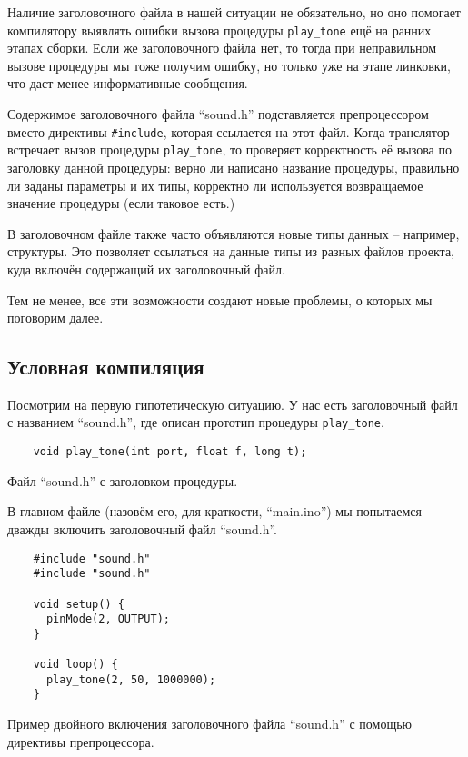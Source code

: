\documentclass[../sparc.tex]{subfiles}
\begin{document}
Наличие заголовочного файла в нашей ситуации не обязательно, но оно помогает
компилятору выявлять ошибки вызова процедуры \texttt{play_tone} ещё на
ранних этапах сборки.  Если же заголовочного файла нет, то тогда при
неправильном вызове процедуры мы тоже получим ошибку, но только уже на этапе
линковки, что даст менее информативные сообщения.

Содержимое заголовочного файла ``sound.h'' подставляется препроцессором вместо
директивы \texttt{#include}, которая ссылается на этот файл.  Когда
транслятор встречает вызов процедуры \texttt{play_tone}, то проверяет
корректность её вызова по заголовку данной процедуры: верно ли написано название
процедуры, правильно ли заданы параметры и их типы, корректно ли используется
возвращаемое значение процедуры (если таковое есть.)

В заголовочном файле также часто объявляются новые типы данных -- например,
структуры.  Это позволяет ссылаться на данные типы из разных файлов проекта,
куда включён содержащий их заголовочный файл.

Тем не менее, все эти возможности создают новые проблемы, о которых мы поговорим
далее.

\subsection{Условная компиляция}
\label{subsection:conditional-compiling}

Посмотрим на первую гипотетическую ситуацию.  У нас есть заголовочный файл с
названием ``sound.h'', где описан прототип процедуры
\texttt{play_tone}.

\begin{listing}[H]
  \begin{verbatim}
    void play_tone(int port, float f, long t);
  \end{verbatim}
  \label{listing:game-dev-engine-procedure-header-2}
  \caption{Файл ``sound.h'' с заголовком процедуры.}
\end{listing}

В главном файле (назовём его, для краткости, ``main.ino'') мы попытаемся дважды
включить заголовочный файл ``sound.h''.

\begin{listing}[H]
  \begin{verbatim}
    #include "sound.h"
    #include "sound.h"

    void setup() {
      pinMode(2, OUTPUT);
    }

    void loop() {
      play_tone(2, 50, 1000000);
    }
  \end{verbatim}
  \label{listing:game-dev-engine-procedure-header-include-2}
  \caption{Пример двойного включения заголовочного файла ``sound.h'' с помощью
    директивы препроцессора.}
\end{listing}
\end{document}
